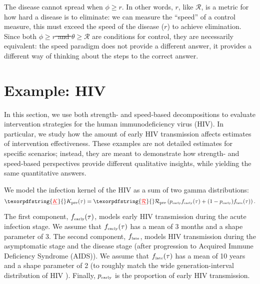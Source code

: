 \documentclass[12pt]{article}
\newcommand{\RR}{\ensuremath{{\mathcal R}}}
\newcommand{\Rx}[1]{\ensuremath{\RR_{\mathrm{#1}}}} %
\newcommand{\Rpre}{\Rx{pre}} %
\newcommand{\KK}{\ensuremath{{K}}} %
\newcommand{\Kx}[1]{\ensuremath{\KK_{\mathrm{#1}}}} %
\newcommand{\Kpre}{\Kx{pre}} %
\newcommand{\rr}{\ensuremath{{r}}}
\newcommand{\rx}[1]{\ensuremath{\rr_{\mathrm{#1}}}} %
\newcommand{\rpre}{\rx{pre}} %
\newcommand{\tsub}[2]{#1_{{\textrm{\tiny #2}}}}
\providecommand{\DIFaddtex}[1]{{\protect\color{blue}\uwave{#1}}} %
\providecommand{\DIFdeltex}[1]{{\protect\color{red}\sout{#1}}}                      %
\providecommand{\DIFaddbegin}{} %
\providecommand{\DIFaddend}{} %
\providecommand{\DIFdelbegin}{} %
\providecommand{\DIFdelend}{} %
\providecommand{\DIFadd}[1]{\texorpdfstring{\DIFaddtex{#1}}{#1}} %
\providecommand{\DIFdel}[1]{\texorpdfstring{\DIFdeltex{#1}}{}} %
\newcommand{\DIFscaledelfig}{0.5}
\newlength{\DIFdelgraphicswidth} %
\newlength{\DIFdelgraphicsheight} %
\newcommand{\DIFaddincludegraphics}[2][]{{\color{blue}\fbox{\DIFOincludegraphics[#1]{#2}}}} %
\newcommand{\DIFdelincludegraphics}[2][]{%
\sbox{\DIFdelgraphicsbox}{\DIFOincludegraphics[#1]{#2}}%
\settoboxwidth{\DIFdelgraphicswidth}{\DIFdelgraphicsbox} %
\settoboxtotalheight{\DIFdelgraphicsheight}{\DIFdelgraphicsbox} %
\scalebox{\DIFscaledelfig}{%
\parbox[b]{\DIFdelgraphicswidth}{\usebox{\DIFdelgraphicsbox}\\[-\baselineskip] \rule{\DIFdelgraphicswidth}{0em}}\llap{\resizebox{\DIFdelgraphicswidth}{\DIFdelgraphicsheight}{%
\setlength{\unitlength}{\DIFdelgraphicswidth}%
\begin{picture}(1,1)%
\thicklines\linethickness{2pt} %
{\color[rgb]{1,0,0}\put(0,0){\framebox(1,1){}}}%
{\color[rgb]{1,0,0}\put(0,0){\line( 1,1){1}}}%
{\color[rgb]{1,0,0}\put(0,1){\line(1,-1){1}}}%
\end{picture}%
}\hspace*{3pt}}} %
} %
\DeclareRobustCommand{\DIFaddbegin}{\DIFOaddbegin \let\includegraphics\DIFaddincludegraphics} %
\DeclareRobustCommand{\DIFaddend}{\DIFOaddend \let\includegraphics\DIFOincludegraphics} %
\DeclareRobustCommand{\DIFdelbegin}{\DIFOdelbegin \let\includegraphics\DIFdelincludegraphics} %
\DeclareRobustCommand{\DIFdelend}{\DIFOaddend \let\includegraphics\DIFOincludegraphics} %
\begin{document}
The disease cannot spread when \DIFdelbegin \DIFdel{$\phi \geq r$}\DIFdelend \DIFaddbegin \DIFadd{$\phi \geq \rpre$}\DIFaddend . In other words, \rr, like \RR, is a metric for how hard a disease is to eliminate: we can measure the ``speed'' of a control measure, this must exceed the speed of the disease (\rr) to achieve elimination. Since both \DIFdelbegin \DIFdel{$\phi \geq r$ and $\theta \geq \RR$ }\DIFdelend \DIFaddbegin \DIFadd{$\phi \geq \rpre$ and $\theta \geq \Rpre$ }\DIFaddend are conditions for control, they are necessarily equivalent: the speed paradigm does not provide a different answer, it provides a different way of thinking about the steps to the correct answer.

\section{Example: HIV}

In this section, we use both strength- and speed-based decompositions to evaluate intervention strategies for the human immunodeficiency virus (HIV). 
In particular, we study how the amount of early HIV transmission affects estimates of intervention effectiveness. 
These examples are not detailed estimates for specific scenarios; 
instead, they are meant to demonstrate how strength- and speed-based perspectives provide different qualitative insights, while yielding the same quantitative answers.

We model the \DIFaddbegin \DIFadd{pre-intervention }\DIFaddend infection kernel of the HIV as a sum of two gamma distributions:
\begin{equation}
\DIFdelbegin \DIFdel{K}\DIFdelend \DIFaddbegin \Kpre\DIFaddend (\tau) = \DIFdelbegin \DIFdel{\mathcal R }\DIFdelend \DIFaddbegin \Rpre \DIFaddend \left(\tsub{p}{early} \tsub{f}{early}(\tau) + (1-\tsub{p}{early}) \tsub{f}{late}(\tau) \right).
\end{equation}
The first component, $\tsub{f}{early}(\tau)$, models early HIV transmission during the acute infection stage.
We assume that $\tsub{f}{early}(\tau)$ has a mean of 3 months \citep{hollingsworth2008hiv} and a shape parameter of 3.
The second component, $\tsub{f}{late}$, models HIV transmission during the asymptomatic stage and the disease stage (after progression to Acquired Immune Deficiency Syndrome (AIDS)).
We assume that $\tsub{f}{late}(\tau)$ has a mean of 10 years \citep{brookmeyer1989censoring, nishiura2019estimating} and a shape parameter of 2 (to roughly match the wide generation-interval distribution of HIV \citep{fraser2004factors}).
Finally, $\tsub{p}{early}$ is the proportion of early HIV transmission.
\end{document}

